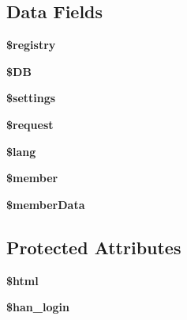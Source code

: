 \subsection*{Data Fields}
\begin{DoxyCompactItemize}
\item 
\hypertarget{classadmin__core__login__manual_resolver_a531e4a386aaa7f3e06d3642dc38d7e80}{{\bfseries \$registry}}\label{classadmin__core__login__manual_resolver_a531e4a386aaa7f3e06d3642dc38d7e80}

\item 
\hypertarget{classadmin__core__login__manual_resolver_a7dc56dc8b18ad37272b56fa7395bedef}{{\bfseries \$\-D\-B}}\label{classadmin__core__login__manual_resolver_a7dc56dc8b18ad37272b56fa7395bedef}

\item 
\hypertarget{classadmin__core__login__manual_resolver_ac7c3353107070daa85f641882931b358}{{\bfseries \$settings}}\label{classadmin__core__login__manual_resolver_ac7c3353107070daa85f641882931b358}

\item 
\hypertarget{classadmin__core__login__manual_resolver_abb35c8495a232b510389fa6d7b15d38a}{{\bfseries \$request}}\label{classadmin__core__login__manual_resolver_abb35c8495a232b510389fa6d7b15d38a}

\item 
\hypertarget{classadmin__core__login__manual_resolver_a7714b111b644017933931ec69a154102}{{\bfseries \$lang}}\label{classadmin__core__login__manual_resolver_a7714b111b644017933931ec69a154102}

\item 
\hypertarget{classadmin__core__login__manual_resolver_a5e1c849c6148a8732eee400fcee0d044}{{\bfseries \$member}}\label{classadmin__core__login__manual_resolver_a5e1c849c6148a8732eee400fcee0d044}

\item 
\hypertarget{classadmin__core__login__manual_resolver_ae9d848ba2cf6eee63bdc060e2dfcf95a}{{\bfseries \$member\-Data}}\label{classadmin__core__login__manual_resolver_ae9d848ba2cf6eee63bdc060e2dfcf95a}

\end{DoxyCompactItemize}
\subsection*{Protected Attributes}
\begin{DoxyCompactItemize}
\item 
\hypertarget{classadmin__core__login__manual_resolver_a6f96e7fc92441776c9d1cd3386663b40}{{\bfseries \$html}}\label{classadmin__core__login__manual_resolver_a6f96e7fc92441776c9d1cd3386663b40}

\item 
\hypertarget{classadmin__core__login__manual_resolver_aad73b91edba92363f168884f69994cea}{{\bfseries \$han\-\_\-login}}\label{classadmin__core__login__manual_resolver_aad73b91edba92363f168884f69994cea}

\end{DoxyCompactItemize}
